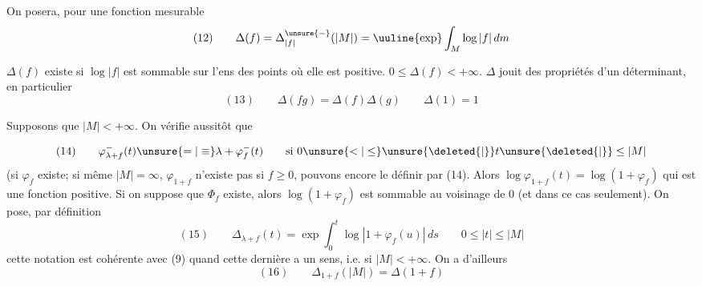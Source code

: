 
On posera, pour une fonction mesurable 
\[
(12)\qquad\Delta(f)=\Delta^{\unsure{-}}_{|f|}(|M|)=\uuline{\exp}\int_M\log|f|\,dm
\]
\par{}
\(\Delta(f)\) existe  si \(\log|f|\) est sommable sur l'ens des points où elle est positive. \(0\leq\Delta(f)<+\infty\).
\(\Delta\) jouit des propriétés d'un  déterminant, en particulier
\[
(13)\qquad\Delta(fg)=\Delta(f)\Delta(g)\qquad\Delta(1)=1
\]

Supposons que \(|M|<+\infty\). On vérifie aussitôt que  \par{}\par{}
\[
(14)\qquad\varphi^-_{\lambda+f}(t)\unsure{=|\equiv}\lambda+\varphi_f^-(t)\qquad\text{si }0\unsure{<|\leq}\unsure{\deleted{\lvert}}t\unsure{\deleted{\rvert}}\leq|M|
\]
(si \(\varphi_f\) existe; si même \(|M|=\infty\), \(\varphi_{1+f}\) n'existe pas  si \(f\geq0\),  pouvons encore le définir par (14). Alors \(\log\varphi_{1+f}(t)=\log(1+\varphi_f)\) qui est une fonction positive. Si on suppose que \(\Phi_f\) existe, alors \(\log(1+\varphi_f)\) est sommable au voisinage de \(0\) (et dans ce cas seulement). On pose, par définition
\[
(15)\qquad\Delta_{\lambda+f}(t)=\exp\int_0^t\log|1+\varphi_f(u)|\,ds
\qquad0\leq|t|\leq|M|
\]
cette notation est cohérente avec (9) quand cette dernière a un sens, i.e. si \(|M|<+\infty\). On a d'ailleurs
\[
(16)\qquad\Delta_{1+f}(|M|)=\Delta(1+f)
\]

